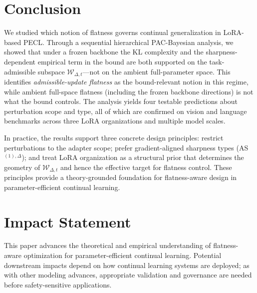 \section{Conclusion}
\label{sec:conclusion}

We studied which notion of flatness governs continual generalization in LoRA-based PECL.
Through a sequential hierarchical PAC-Bayesian analysis, we showed that under a frozen backbone the KL complexity and the sharpness-dependent empirical term in the bound are both supported on the task-admissible subspace $\mathcal{W}_{\Delta,t}$---not on the ambient full-parameter space.
This identifies \emph{admissible-update flatness} as the bound-relevant notion in this regime, while ambient full-space flatness (including the frozen backbone directions) is not what the bound controls.
The analysis yields four testable predictions about perturbation scope and type, all of which are confirmed on vision and language benchmarks across three LoRA organizations and multiple model scales.

In practice, the results support three concrete design principles: restrict perturbations to the adapter scope; prefer gradient-aligned sharpness types (AS$^{(1),\Delta}$); and treat LoRA organization as a structural prior that determines the geometry of $\mathcal{W}_{\Delta,t}$ and hence the effective target for flatness control.
These principles provide a theory-grounded foundation for flatness-aware design in parameter-efficient continual learning.

\section*{Impact Statement}
This paper advances the theoretical and empirical understanding of flatness-aware optimization for parameter-efficient continual learning.
Potential downstream impacts depend on how continual learning systems are deployed; as with other modeling advances, appropriate validation and governance are needed before safety-sensitive applications.
